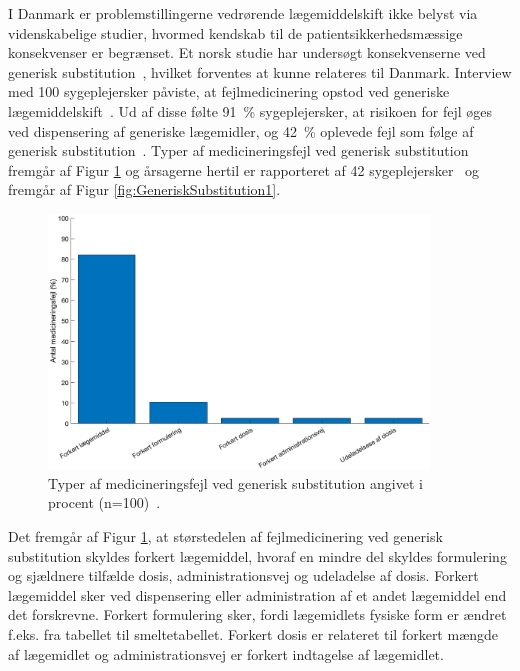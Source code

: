 I Danmark er problemstillingerne vedrørende lægemiddelskift ikke belyst via videnskabelige studier, hvormed kendskab til de patientsikkerhedsmæssige konsekvenser er begrænset. Et norsk studie har undersøgt konsekvenserne ved generisk substitution~\citep{Hakonsen2010}, hvilket forventes at kunne relateres til Danmark. Interview med 100 sygeplejersker påviste, at fejlmedicinering opstod ved generiske lægemiddelskift~\citep{Hakonsen2010}. Ud af disse følte 
91~\% sygeplejersker, at risikoen for fejl øges ved dispensering af generiske lægemidler, og 42~\% oplevede fejl som følge af generisk substitution~\citep{Hakonsen2010}.
Typer af medicineringsfejl ved generisk substitution fremgår af Figur \ref{fig:GeneriskSubstitution} og årsagerne hertil er rapporteret af 42 sygeplejersker~\citep{Hakonsen2010} og fremgår af Figur \ref{fig:GeneriskSubstitution1}.

\begin{figure}[H]\centering	\includegraphics[width=0.9\textwidth]{billeder/GenSubb.png} 
	\caption{Typer af medicineringsfejl ved generisk substitution angivet i procent (n=100)~\citep{Hakonsen2010}.}
	\label{fig:GeneriskSubstitution}  
\end{figure}
\vspace{-0.5cm}

Det fremgår af Figur \ref{fig:GeneriskSubstitution}, at  størstedelen af fejlmedicinering ved generisk substitution skyldes forkert lægemiddel, hvoraf en mindre del skyldes formulering og sjældnere tilfælde dosis, administrationsvej og udeladelse af dosis. Forkert lægemiddel sker ved dispensering eller administration af et andet lægemiddel end det forskrevne. Forkert formulering sker, fordi lægemidlets fysiske form er ændret f.eks. fra tabellet til smeltetabellet. Forkert dosis er relateret til forkert mængde af lægemidlet og administrationsvej er forkert indtagelse af lægemidlet. 

